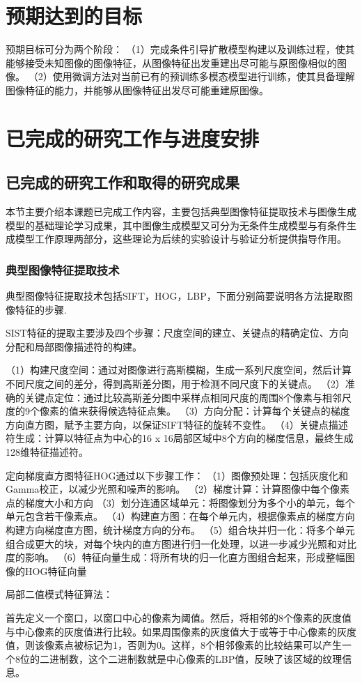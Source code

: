 \section{预期达到的目标}
预期目标可分为两个阶段：
（1）完成条件引导扩散模型构建以及训练过程，使其能够接受未知图像的图像特征，从图像特征出发重建出尽可能与原图像相似的图像。
（2）使用微调方法对当前已有的预训练多模态模型进行训练，使其具备理解图像特征的能力，并能够从图像特征出发尽可能重建原图像。
\section{已完成的研究工作与进度安排}
\subsection{已完成的研究工作和取得的研究成果}\label{sec:finishwork}
本节主要介绍本课题已完成工作内容，主要包括典型图像特征提取技术与图像生成模型的基础理论学习成果，其中图像生成模型又可分为无条件生成模型与有条件生成模型工作原理两部分，这些理论为后续的实验设计与验证分析提供指导作用。
\subsubsection{典型图像特征提取技术}
典型图像特征提取技术包括SIFT，HOG，LBP，下面分别简要说明各方法提取图像特征的步骤.
\par
SIST特征的提取主要涉及四个步骤：尺度空间的建立、关键点的精确定位、方向分配和局部图像描述符的构建。
\par
（1）构建尺度空间：通过对图像进行高斯模糊，生成一系列尺度空间，然后计算不同尺度之间的差分，得到高斯差分图，用于检测不同尺度下的关键点。
（2）准确的关键点定位：通过比较高斯差分图中采样点相同尺度的周围8个像素与相邻尺度的9个像素的值来获得候选特征点集。
（3）方向分配：‌计算每个关键点的梯度方向直方图，赋予主要方向，以保证SIFT特征的旋转不变性。
（4）关键点描述符生成：计算以特征点为中心的16 x 16局部区域中8个方向的梯度信息，最终生成128维特征描述符。
\par
定向梯度直方图特征HOG通过以下步骤工作：‌
（1）图像预处理：包括灰度化和Gamma校正，以减少光照和噪声的影响。
（2）‌梯度计算：‌计算图像中每个像素点的梯度大小和方向
（3）划分连通区域单元：‌将图像划分为多个小的单元，每个单元包含若干像素点。
（4）构建直方图：‌在每个单元内，根据像素点的梯度方向构建方向梯度直方图，统计梯度方向的分布。
（5）组合块并归一化：将多个单元组合成更大的块，对每个块内的直方图进行归一化处理，以进一步减少光照和对比度的影响。
（6）特征向量生成：将所有块的归一化直方图组合起来，形成整幅图像的HOG特征向量
\par
局部二值模式特征算法：
\par
首先定义一个窗口‌，以窗口中心的像素为阈值。然后，将相邻的8个像素的灰度值与中心像素的灰度值进行比较。如果周围像素的灰度值大于或等于中心像素的灰度值，则该像素点被标记为1，否则为0。这样，8个相邻像素的比较结果可以产生一个8位的二进制数，这个二进制数就是中心像素的LBP值，反映了该区域的纹理信息。
